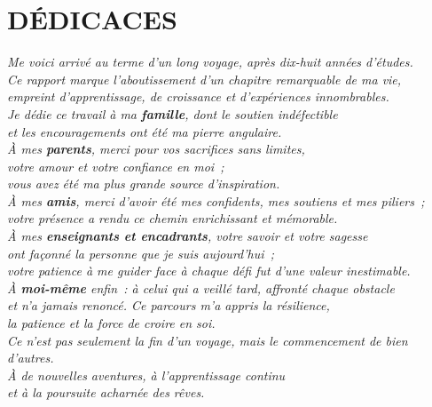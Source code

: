 \chapter*{DÉDICACES}
\thispagestyle{MyStyle}

\vspace*{0.6cm}
\begin{center}
{\large\itshape%
Me voici arrivé au terme d'un long voyage, après dix-huit années d'études.\\
Ce rapport marque l'aboutissement d'un chapitre remarquable de ma vie,\\
empreint d'apprentissage, de croissance et d'expériences innombrables.\\[0.7em]
Je dédie ce travail à ma \textbf{famille}, dont le soutien indéfectible\\
et les encouragements ont été ma pierre angulaire.\\[0.7em]
À mes \textbf{parents}, merci pour vos sacrifices sans limites,\\
votre amour et votre confiance en moi~;\\
vous avez été ma plus grande source d'inspiration.\\[0.7em]
À mes \textbf{amis}, merci d'avoir été mes confidents, mes soutiens et mes piliers~;\\
votre présence a rendu ce chemin enrichissant et mémorable.\\[0.7em]
À mes \textbf{enseignants et encadrants}, votre savoir et votre sagesse\\
ont façonné la personne que je suis aujourd'hui~;\\
votre patience à me guider face à chaque défi fut d'une valeur inestimable.\\[0.7em]
À \textbf{moi-même} enfin~: à celui qui a veillé tard, affronté chaque obstacle\\
et n'a jamais renoncé. Ce parcours m'a appris la résilience,\\
la patience et la force de croire en soi.\\[0.7em]
Ce n'est pas seulement la fin d'un voyage, mais le commencement de bien d'autres.\\
À de nouvelles aventures, à l'apprentissage continu\\
et à la poursuite acharnée des rêves.
}
\end{center}

